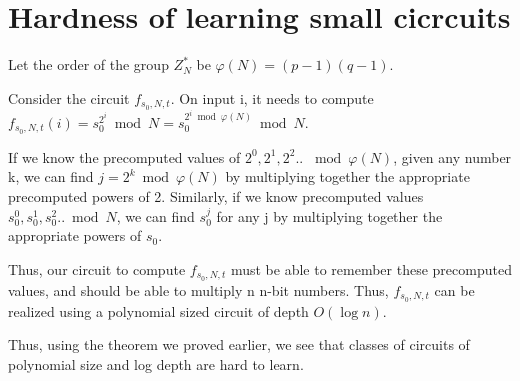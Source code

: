 \documentclass{article}
\begin{document}
\section{Hardness of learning small cicrcuits}
Let the order of the group $Z^{*}_{N}$ be $\varphi(N) = (p-1)(q-1)$.

Consider the circuit $f_{s_{0}, N, t}$. On input i, it needs to compute $f_{s_{0}, N, t}(i) = s_{0}^{2^{i}} \bmod N = s_{0}^{2^{i} \bmod \varphi(N)} \bmod N$.

If we know the precomputed values of $2^{0}, 2^{1}, 2^{2} .. $ $\bmod \varphi(N)$, given any number k, we can find $j=2^{k} \bmod \varphi(N)$ by multiplying together the appropriate precomputed powers of 2. Similarly, if we know precomputed values $s_{0}^{0}, s_{0}^{1}, s_{0}^{2} .. \bmod N$, we can find  $s_{0}^{j}$ for any j by multiplying together the appropriate powers of $s_{0}$.

Thus, our circuit to compute $f_{s_{0}, N, t}$ must be able to remember these precomputed values, and should be able to multiply n n-bit numbers. Thus, $f_{s_{0}, N, t}$ can be realized using a polynomial sized circuit of depth $O(\log n)$.

Thus, using the theorem we proved earlier, we see that classes of circuits of polynomial size and log depth are hard to learn.
\end{document}
